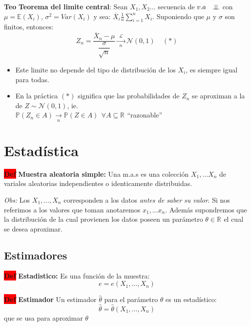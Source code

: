 \documentclass[letterpaper,10.5pt,twocolumn]{article} %
\newcommand{\R}[1][]{\mathbb{R}^{#1}}
\newcommand{\E}{\mathbb{E} }
\newcommand{\Proba}{\mathbb{P} }
\newcommand{\hlc}[2][yellow]{ \colorbox{#1}{#2} }
\newcommand{\Def}{\hlc[red]{\bfseries Def}}
\newcommand{\Teo}{\hlc[applegreen]{\bfseries Teo}}
\newcommand{\independent}{\perp\mkern-9.5mu\perp}
\let\oldfrac=\frac
\renewcommand{\frac}[2]{\ensuremath{\oldfrac{#1}{#2}}}
\begin{document}
\Teo \textbf{Teorema del limite central}: Sean $X_{1}, X_2 \ldots $ secuencia de $v.a\ \ \independent $ con $\mu = \E(X_i) $, $\sigma^2 = Var(X_i) $ y sea: $\overline{X}_i \frac{1}{n}\sum_{i=1}^{n} X_i $. Suponiendo que $\mu$ y $\sigma$ son finitos, entonces:
\begin{equation*}
    Z_n = \dfrac{\overline{X}_n - \mu }{\dfrac{\sigma}{\sqrt{n}}} \xrightarrow[\ \ n\ \ ]{\mathcal{L}} \mathcal{N}(0,1) \ \ \ \ \ (*)
\end{equation*}
\begin{itemize}
    \item Este limite no depende del tipo de distribución de los $X_{i}$, es siempre igual para todas.
    \item En la práctica $(*)$ significa que las probabilidades de $Z_n $ se aproximan a la de $Z\sim \mathcal{N}(0,1)$, ie.\\ $\Proba(Z_n\in A) \xrightarrow[n]{} \Proba(Z \in A)\ \ \forall A\subseteq \R$ ``razonable'' 
\end{itemize}

\section{Estadística}

\Def \textbf{Muestra aleatoria simple:} Una m.a.s es una colección $X_1, \ldots X_n $ de variales aleatorias independientes o identicamente distribuidas.

\textit{Obs:} Los  $X_1, \ldots, X_n $ corresponden a los datos \textit{antes de saber su valor}. Si nos referimos a los valores que toman anotaremos $x_1, \ldots x_n $. Además supondremos que la distribución de la cual provienen los datos poseen un parámetro $\theta\in\R $ el cual se desea aproximar. 

\subsection{Estimadores}

\Def \textbf{Estadistico:} Es una función de la muestra:
\begin{equation*}
    e=e(X_1, \ldots, X_n)
\end{equation*}

\Def \textbf{Estimador} Un estimador $\hat{\theta} $ para el parámetro $\theta $ es un estadístico:
\begin{equation*}
    \hat{\theta} = \hat{\theta} (X_1, \ldots, X_n)
\end{equation*}
que se usa para aproximar $\theta$
\end{document}

